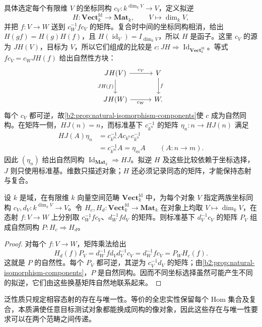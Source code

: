 \ProseParagraphBreak
具体选定每个有限维 \(V\) 的坐标同构 \(c_V:k^{\dim_k V}\rightarrow V\)，定义拟逆
\[
	H:\mathbf{Vect}_k^{\mathrm{fd}}\longrightarrow\mathbf{Mat}_k, \qquad V\longmapsto\dim_kV,
\]
并把 \(f:V\rightarrow W\) 送到 \(c_W^{-1}fc_V\) 的矩阵。复合时中间的坐标同构相消，给出 \(H(gf)=H(g)H(f)\)，且 \(H(\operatorname{id}_V)=I_{\dim_kV}\)，所以 \(H\) 是函子。这里 \(c_V\) 的源为 \(JH(V)\)，目标为 \(V\)，所以它们组成的比较是 \(c:JH\Rightarrow\operatorname{Id}_{\mathbf{Vect}_k^{\mathrm{fd}}}\)。等式 \(fc_V=c_WJH(f)\) 给出自然性方块：
\[
	\begin{tikzcd}[column sep=3em,row sep=2em]
		JH(V)\arrow[r,"c_V"]\arrow[d,"JH(f)"']&V\arrow[d,"f"]\\
		JH(W)\arrow[r,"c_W"']&W.
	\end{tikzcd}
\]
每个 \(c_V\) 都可逆，故\cref{b2:prop:natural-isomorphism-components}使 \(c\) 成为自然同构。在矩阵一侧，\(HJ(n)=n\)，而标准基下 \(c_{k^n}^{-1}\) 的矩阵 \(\eta_n:n\to HJ(n)\) 满足
\[
	\begin{aligned}
		HJ(A)\eta_n&=c_{k^m}^{-1}Ac_{k^n}c_{k^n}^{-1}\\
		&=c_{k^m}^{-1}A=\eta_mA \qquad(A:n\to m).
	\end{aligned}
\]
因此 \((\eta_n)\) 给出自然同构 \(\operatorname{Id}_{\mathbf{Mat}_k}\Rightarrow HJ\)。拟逆 \(H\) 及这些比较依赖于坐标选择，\(J\) 则只使用标准基。维数只描述对象；\(H\) 还必须记录同态的矩阵，才能保持态射与复合。

\begin{proposition}\label{b2:prop:coordinate-choice-natural}
	设 \(k\) 是域，在有限维 \(k\) 向量空间范畴 \(\mathbf{Vect}_k^{\mathrm{fd}}\) 中，为每个对象 \(V\) 指定两族坐标同构 \(c_V,d_V:k^{\dim_kV}\to V\)。令 \(H_c,H_d:\mathbf{Vect}_k^{\mathrm{fd}}\to\mathbf{Mat}_k\) 在对象上均取 \(V\mapsto\dim_kV\)，在态射 \(f:V\to W\) 上分别取 \(c_W^{-1}fc_V\)、\(d_W^{-1}fd_V\) 的矩阵。则标准基下 \(d_V^{-1}c_V\) 的矩阵 \(P_V\) 组成自然同构 \(P:H_c\Rightarrow H_d\)。
\end{proposition}
\begin{proof}
	对每个 \(f:V\to W\)，矩阵乘法给出
	\[
		H_d(f)P_V=d_W^{-1}fd_Vd_V^{-1}c_V =d_W^{-1}fc_V=P_WH_c(f).
	\]
	这就是 \(P\) 的自然性。每个 \(P_V\) 都可逆，其逆为 \(c_V^{-1}d_V\) 的矩阵；由\cref{b2:prop:natural-isomorphism-components}，\(P\) 是自然同构。因而不同坐标选择虽然可能产生不同的拟逆，它们由这些换基矩阵自然地联系起来。
\end{proof}

泛性质只规定相容态射的存在与唯一性。等价的全忠实性保留每个 Hom 集合及复合，本质满使任意目标测试对象都能换成同构的像对象，因此这些存在与唯一性要求可以在两个范畴之间传递。

